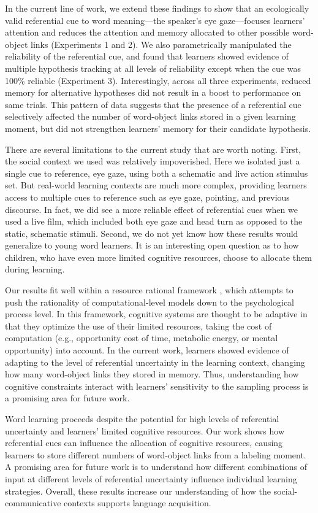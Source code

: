 \documentclass[10pt,letterpaper]{article}
\begin{document}
In the current line of work, we extend these findings to show that an ecologically valid referential cue to word meaning---the speaker's eye gaze---focuses learners' attention and reduces the attention and memory allocated to other possible word-object links (Experiments 1 and 2). We also parametrically manipulated the reliability of the referential cue, and found that learners showed evidence of multiple hypothesis tracking at all levels of reliability except when the cue was 100\% reliable (Experiment 3). Interestingly, across all three experiments, reduced memory for alternative hypotheses did not result in a boost to performance on same trials. This pattern of data suggests that the presence of a referential cue selectively affected the number of word-object links stored in a given learning moment, but did not strengthen learners' memory for their candidate hypothesis. 

There are several limitations to the current study that are worth noting. First, the social context we used was relatively impoverished. Here we isolated just a single cue to reference, eye gaze, using both a schematic and live action stimulus set. But real-world learning contexts are much more complex, providing learners access to multiple cues to reference such as eye gaze, pointing, and previous discourse. In fact, we did see a more reliable effect of referential cues when we used a live film, which included both eye gaze and head turn as opposed to the static, schematic stimuli. Second, we do not yet know how these results would generalize to young word learners. It is an interesting open question as to how children, who have even more limited cognitive resources, choose to allocate them during learning.

Our results fit well within a resource rational framework \cite{griffiths2014rational}, which attempts to push the rationality of computational-level models down to the psychological process level. In this framework, cognitive systems are thought to be adaptive in that they optimize the use of their limited resources, taking the cost of computation (e.g., opportunity cost of time, metabolic energy, or mental opportunity) into account. In the current work, learners showed evidence of adapting to the level of referential uncertainty in the learning context,  changing how many word-object links they stored in memory.  Thus, understanding how cognitive constraints interact with learners' sensitivity to the sampling process is a promising area for future work.

Word learning proceeds despite the potential for high levels of referential uncertainty and learners' limited cognitive resources. Our work shows how referential cues can influence the allocation of cognitive resources, causing learners to store different numbers of word-object links from a labeling moment. A promising area for future work is to understand how different combinations of input at different levels of referential uncertainty influence individual learning strategies. Overall, these results increase our understanding of how the social-communicative contexts supports language acquisition. 
\end{document}
